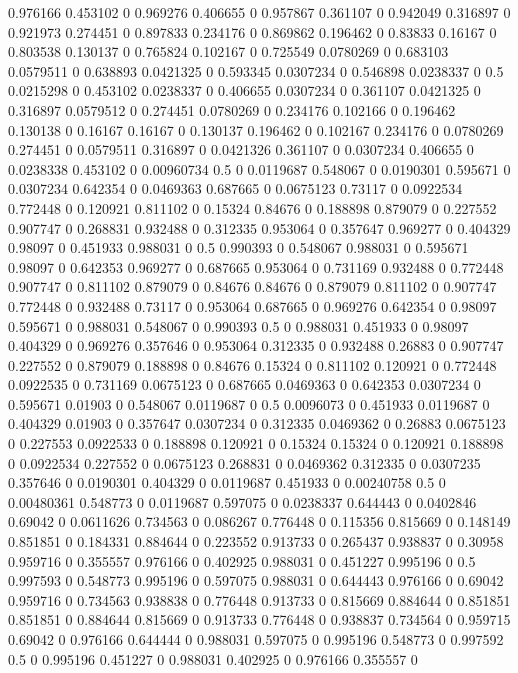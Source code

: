 0.976166 0.453102 0
0.969276 0.406655 0
0.957867 0.361107 0
0.942049 0.316897 0
0.921973 0.274451 0
0.897833 0.234176 0
0.869862 0.196462 0
0.83833 0.16167 0
0.803538 0.130137 0
0.765824 0.102167 0
0.725549 0.0780269 0
0.683103 0.0579511 0
0.638893 0.0421325 0
0.593345 0.0307234 0
0.546898 0.0238337 0
0.5 0.0215298 0
0.453102 0.0238337 0
0.406655 0.0307234 0
0.361107 0.0421325 0
0.316897 0.0579512 0
0.274451 0.0780269 0
0.234176 0.102166 0
0.196462 0.130138 0
0.16167 0.16167 0
0.130137 0.196462 0
0.102167 0.234176 0
0.0780269 0.274451 0
0.0579511 0.316897 0
0.0421326 0.361107 0
0.0307234 0.406655 0
0.0238338 0.453102 0
0.00960734 0.5 0
0.0119687 0.548067 0
0.0190301 0.595671 0
0.0307234 0.642354 0
0.0469363 0.687665 0
0.0675123 0.73117 0
0.0922534 0.772448 0
0.120921 0.811102 0
0.15324 0.84676 0
0.188898 0.879079 0
0.227552 0.907747 0
0.268831 0.932488 0
0.312335 0.953064 0
0.357647 0.969277 0
0.404329 0.98097 0
0.451933 0.988031 0
0.5 0.990393 0
0.548067 0.988031 0
0.595671 0.98097 0
0.642353 0.969277 0
0.687665 0.953064 0
0.731169 0.932488 0
0.772448 0.907747 0
0.811102 0.879079 0
0.84676 0.84676 0
0.879079 0.811102 0
0.907747 0.772448 0
0.932488 0.73117 0
0.953064 0.687665 0
0.969276 0.642354 0
0.98097 0.595671 0
0.988031 0.548067 0
0.990393 0.5 0
0.988031 0.451933 0
0.98097 0.404329 0
0.969276 0.357646 0
0.953064 0.312335 0
0.932488 0.26883 0
0.907747 0.227552 0
0.879079 0.188898 0
0.84676 0.15324 0
0.811102 0.120921 0
0.772448 0.0922535 0
0.731169 0.0675123 0
0.687665 0.0469363 0
0.642353 0.0307234 0
0.595671 0.01903 0
0.548067 0.0119687 0
0.5 0.0096073 0
0.451933 0.0119687 0
0.404329 0.01903 0
0.357647 0.0307234 0
0.312335 0.0469362 0
0.26883 0.0675123 0
0.227553 0.0922533 0
0.188898 0.120921 0
0.15324 0.15324 0
0.120921 0.188898 0
0.0922534 0.227552 0
0.0675123 0.268831 0
0.0469362 0.312335 0
0.0307235 0.357646 0
0.0190301 0.404329 0
0.0119687 0.451933 0
0.00240758 0.5 0
0.00480361 0.548773 0
0.0119687 0.597075 0
0.0238337 0.644443 0
0.0402846 0.69042 0
0.0611626 0.734563 0
0.086267 0.776448 0
0.115356 0.815669 0
0.148149 0.851851 0
0.184331 0.884644 0
0.223552 0.913733 0
0.265437 0.938837 0
0.30958 0.959716 0
0.355557 0.976166 0
0.402925 0.988031 0
0.451227 0.995196 0
0.5 0.997593 0
0.548773 0.995196 0
0.597075 0.988031 0
0.644443 0.976166 0
0.69042 0.959716 0
0.734563 0.938838 0
0.776448 0.913733 0
0.815669 0.884644 0
0.851851 0.851851 0
0.884644 0.815669 0
0.913733 0.776448 0
0.938837 0.734564 0
0.959715 0.69042 0
0.976166 0.644444 0
0.988031 0.597075 0
0.995196 0.548773 0
0.997592 0.5 0
0.995196 0.451227 0
0.988031 0.402925 0
0.976166 0.355557 0

